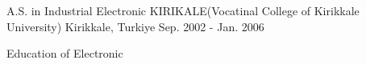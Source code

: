 
\begin{cventries}

  \cventry
    {A.S. in Industrial Electronic} %
    {KIRIKALE(Vocatinal College of Kirikkale University)} %
    {Kirikkale, Turkiye} %
    {Sep. 2002 - Jan. 2006} %
    {
      \begin{cvitems} %
        \item {Education of Electronic }
      \end{cvitems}
    }

\end{cventries}
